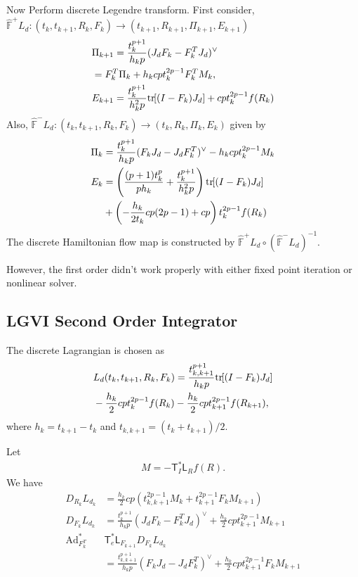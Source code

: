 \documentclass[letterpaper, 10pt, conference]{ieeeconf}
\newcommand{\bracket}[1]{\ensuremath{\left[ #1 \right]}}
\newcommand{\parenth}[1]{\ensuremath{\left( #1 \right)}}
\newcommand{\tr}[1]{\mbox{tr}\ensuremath{\negthickspace\bracket{#1}}}
\newcommand{\T}{\ensuremath{\mathsf{T}}}
\renewcommand{\L}{\ensuremath{\mathsf{L}}}
\newcommand{\Ad}{\ensuremath{\mathrm{Ad}}}
\begin{document}
Now Perform discrete Legendre transform.
First consider, $\hat{\mathbb{F}}^+ L_d: (t_k,t_{k+1},R_k,F_k)\rightarrow(t_{k+1}, R_{k+1}, \Pi_{k+1}, E_{k+1})$
\begin{align*}
&    \Pi_{k+1}  = \frac{t^{p+1}_{k}}{h_k p} (J_dF_k -F_k^T J_d)^\vee \\
& = F_k^T \Pi_k + h_k cp t_k^{2p-1} F_k^T M_k ,\\
&    E_{k+1} = \frac{t^{p+1}_{k}}{h_k^2 p} \tr{(I-F_k)J_d} + c p t_k^{2p-1} f(R_k) 
\end{align*}
Also, $\hat{\mathbb{F}}^- L_d: (t_k,t_{k+1}, R_k, F_k)\rightarrow (t_k, R_k, \Pi_k, E_k)$ given by
\begin{align*}
    \Pi_k & =\frac{t_k^{p+1}}{h_k p} (F_k J_d - J_dF_k^T)^\vee  - h_k cp t_k^{2p-1} M_k \\
    E_k & = \parenth{ \frac{(p+1)t_k^p}{p h_k} + \frac{t^{p+1}_{k}}{h_k^2 p} } \tr{(I-F_k)J_d} \\
    & + \parenth{- \frac{h_k}{2 t_k}cp(2p-1) + c p} t_k^{2p-1} f(R_k) \\
\end{align*}
The discrete Hamiltonian flow map is constructed by $\hat{\mathbb{F}}^+L_d \circ (\hat{\mathbb{F}}^-L_d)^{-1}$.

However, the first order didn't work properly with either fixed point iteration or nonlinear solver. 

\subsection{LGVI Second Order Integrator}


The discrete Lagrangian is chosen as
\begin{align*}
    & L_d(t_k, t_{k+1}, R_k, F_k) = \frac{t_{k,k+1}^{p+1}}{h_k p} \tr{(I-F_k)J_d}\\
    &- \frac{h_k}{2}c p t_k^{2p-1} f(R_k) - \frac{h_k}{2}c p t_{k+1}^{2p-1} f(R_{k+1}),
\end{align*}
where $h_k = t_{k+1}-t_k$ and $t_{k,k+1}=(t_k + t_{k+1})/2$.

Let 
\begin{align*}
    M = -\T^*_I \L_R f(R).
\end{align*}
We have
\begin{align*}
    D_{R_k} L_{d_k} &= \frac{h_k}{2} cp (t_{k,k+1}^{2p-1} M_k + t_{k+1}^{2p-1} F_k M_{k+1})\\
    D_{F_k} L_{d_k} &= \frac{t^{p+1}_{k}}{h_k p} (J_dF_k -F_k^T J_d)^\vee + \frac{h_k}{2} cpt^{2p-1}_{k+1} M_{k+1} \\
    \Ad^*_{F_k^T} & \T^*_e \L_{F_{k+1}} D_{F_k} L_{d_k}\\
                    & = \frac{t^{p+1}_{k,k+1}}{h_k p} (F_k J_d - J_dF_k^T)^\vee + \frac{h_k}{2} cpt^{2p-1}_{k+1} F_k M_{k+1} \\
\end{align*}
\end{document}
